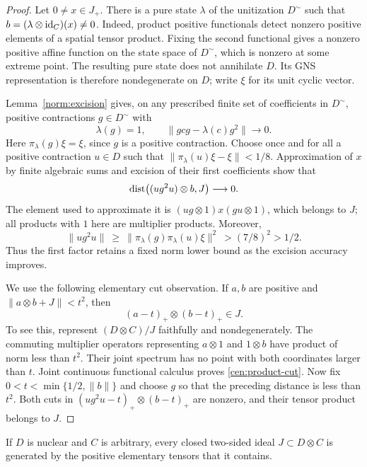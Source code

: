 \begin{proof}
Let $0\ne x\in J_+$.  There is a pure state $\lambda$ of the
unitization $D^{\sim}$ such that
$b=(\lambda\otimes\operatorname{id}_C)(x)\ne0$.
Indeed, product positive functionals detect nonzero positive elements of
a spatial tensor product.  Fixing the second functional gives a nonzero
positive affine function on the state space of $D^{\sim}$, which is
nonzero at some extreme point.  The resulting pure state does not
annihilate $D$.  Its GNS representation is therefore nondegenerate on
$D$; write $\xi$ for its unit cyclic vector.

Lemma~\ref{norm:excision} gives,
on any prescribed finite set of coefficients in $D^{\sim}$, positive
contractions $g\in D^{\sim}$ with
\[
 \lambda(g)=1,\qquad
 \|gcg-\lambda(c)g^2\|\longrightarrow0.
\]
Here $\pi_\lambda(g)\xi=\xi$, since $g$ is a positive contraction.
Choose once and for all a positive contraction $u\in D$ such that
$\|\pi_\lambda(u)\xi-\xi\|<1/8$.  Approximation of $x$ by finite
algebraic sums and excision of their first coefficients show that
\[
 \operatorname{dist}\bigl((ug^2u)\otimes b,J\bigr)\longrightarrow0.
\]
The element used to approximate it is
$(ug\otimes1)x(gu\otimes1)$, which belongs to $J$; all products with
$1$ here are multiplier products.  Moreover,
\[
 \|ug^2u\|\ \ge\
 \|\pi_\lambda(g)\pi_\lambda(u)\xi\|^2
 \ > (7/8)^2>1/2.
\]
Thus the first factor retains a fixed norm lower bound as the excision
accuracy improves.

We use the following elementary cut observation.  If $a,b$ are positive
and $\|a\otimes b+J\|<t^2$, then
\begin{equation}\label{cen:product-cut}
 (a-t)_+\otimes(b-t)_+\in J.
\end{equation}
To see this, represent $(D\otimes C)/J$ faithfully and nondegenerately.
The commuting multiplier operators representing $a\otimes1$ and
$1\otimes b$ have product of norm less than $t^2$.  Their joint spectrum
has no point with both coordinates larger than $t$.  Joint continuous
functional calculus proves \eqref{cen:product-cut}.
Now fix $0<t<\min\{1/2,\|b\|\}$ and choose $g$ so that the preceding
distance is less than $t^2$.  Both cuts in
$(ug^2u-t)_+\otimes(b-t)_+$ are nonzero, and their tensor product
belongs to $J$.
\end{proof}

\begin{lemma}\label{cen:nuclear-tensor-ideals}
If $D$ is nuclear and $C$ is arbitrary, every closed two-sided ideal
$J\subset D\otimes C$ is generated by the positive elementary tensors
that it contains.
\end{lemma}

